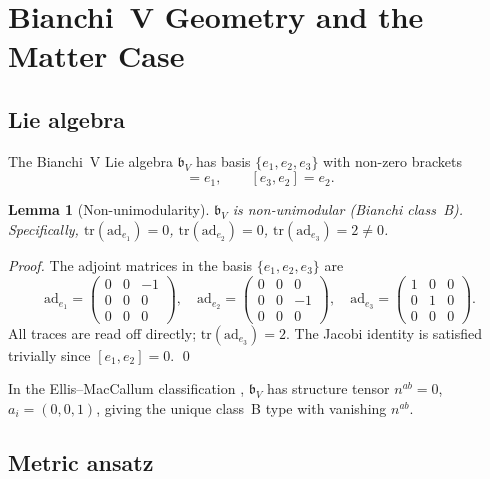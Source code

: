 \documentclass[12pt,letterpaper]{article}
\newtheorem{lemma}[theorem]{Lemma}
\newcommand{\tr}{\mathrm{tr}}
\newcommand{\ad}{\mathrm{ad}}
\begin{document}
\section{Bianchi~V Geometry and the Matter Case}
\label{sec:geometry}

\subsection{Lie algebra}

The Bianchi~V Lie algebra $\mathfrak{b}_V$ has basis $\{e_1,e_2,e_3\}$
with non-zero brackets
\begin{equation}
  [e_3, e_1] = e_1, \qquad [e_3, e_2] = e_2.
  \label{eq:BVbrackets}
\end{equation}

\begin{lemma}[Non-unimodularity]
\label{lem:nouni}
$\mathfrak{b}_V$ is non-unimodular (Bianchi class~B).
Specifically, $\tr(\ad_{e_1}) = 0$, $\tr(\ad_{e_2}) = 0$,
$\tr(\ad_{e_3}) = 2 \neq 0$.
\end{lemma}
\begin{proof}
The adjoint matrices in the basis $\{e_1,e_2,e_3\}$ are
\[
  \ad_{e_1} = \begin{pmatrix}0&0&-1\\0&0&0\\0&0&0\end{pmatrix},\quad
  \ad_{e_2} = \begin{pmatrix}0&0&0\\0&0&-1\\0&0&0\end{pmatrix},\quad
  \ad_{e_3} = \begin{pmatrix}1&0&0\\0&1&0\\0&0&0\end{pmatrix}.
\]
All traces are read off directly; $\tr(\ad_{e_3}) = 2$.
The Jacobi identity is satisfied trivially since $[e_1,e_2]=0$.
\qed
\end{proof}

In the Ellis--MacCallum classification \cite{Ellis-MacCallum69},
$\mathfrak{b}_V$ has structure tensor $n^{ab} = 0$, $a_i = (0,0,1)$,
giving the unique class~B type with vanishing $n^{ab}$.

\subsection{Metric ansatz}
\end{document}
